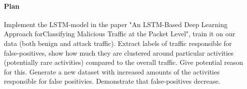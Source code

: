 \documentclass{article}
\begin{document}
\paragraph{Plan}
Implement the LSTM-model in the paper "An LSTM-Based Deep Learning Approach forClassifying Malicious Traffic at the Packet Level", train it on our data (both benign and attack traffic). Extract labels of traffic responsible for false-positives, show how much they are clustered around particular activities (potentially rare activities) compared to the overall traffic. Give potential reason for this. Generate a new dataset with increased amounts of the activities responsible for false positivies. Demonstrate that false-positives decrease.

%
%
%
%
%
%
\end{document}
